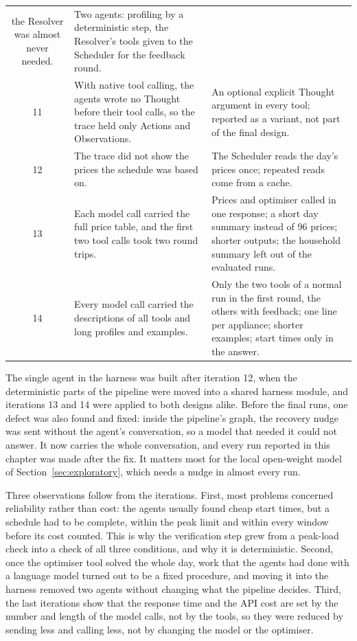 \documentclass[12pt,a4paper]{report}
\begin{document}
\begin{table}[h!]
\begin{tabularx}{\textwidth}{c>{\raggedright\arraybackslash}X>{\raggedright\arraybackslash}X}
  the Resolver was almost never needed. &
  Two agents: profiling by a deterministic step, the Resolver's tools
  given to the Scheduler for the feedback round. \\[3pt]
11 & With native tool calling, the agents wrote no Thought before their
  tool calls, so the trace held only Actions and Observations. &
  An optional explicit Thought argument in every tool; reported as a
  variant, not part of the final design. \\[3pt]
12 & The trace did not show the prices the schedule was based on. &
  The Scheduler reads the day's prices once; repeated reads come from a
  cache. \\[3pt]
13 & Each model call carried the full price table, and the first two
  tool calls took two round trips. &
  Prices and optimiser called in one response; a short day summary
  instead of 96 prices; shorter outputs; the household summary left out
  of the evaluated runs. \\[3pt]
14 & Every model call carried the descriptions of all tools and long
  profiles and examples. &
  Only the two tools of a normal run in the first round, the others with
  feedback; one line per appliance; shorter examples; start times only
  in the answer. \\
\bottomrule
\end{tabularx}
\end{table}

The single agent in the harness was built after iteration 12, when the
deterministic parts of the pipeline were moved into a shared harness
module, and iterations 13 and 14 were applied to both designs alike.
Before the final runs, one defect was also found and fixed: inside the
pipeline's graph, the recovery nudge was sent without the agent's
conversation, so a model that needed it could not answer. It now carries
the whole conversation, and every run reported in this chapter was made
after the fix. It matters most for the local open-weight model of
Section~\ref{sec:exploratory}, which needs a nudge in almost every run.

Three observations follow from the iterations. First, most problems
concerned reliability rather than cost: the agents usually found cheap
start times, but a schedule had to be complete, within the peak limit
and within every window before its cost counted. This is why the
verification step grew from a peak-load check into a check of all three
conditions, and why it is deterministic. Second, once the optimiser tool
solved the whole day, work that the agents had done with a language
model turned out to be a fixed procedure, and moving it into the
harness removed two agents without changing what the pipeline decides.
Third, the last iterations show that the response time and the API cost
are set by the number and length of the model calls, not by the tools,
so they were reduced by sending less and calling less, not by changing
the model or the optimiser.
\end{document}

